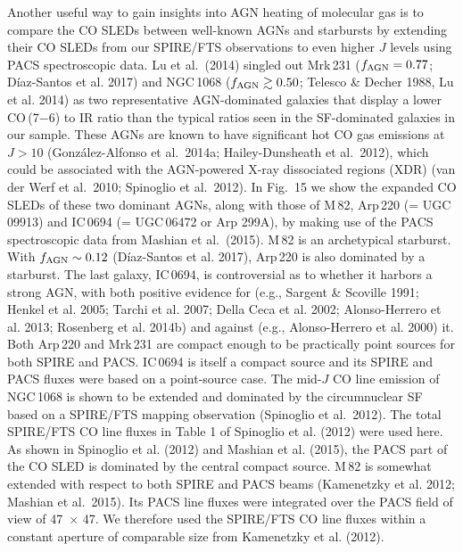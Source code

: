 \documentclass[preprint]{aastex}
\begin{document}
Another useful way to gain insights into AGN heating of molecular gas is to 
compare the CO SLEDs between well-known AGNs and starbursts by extending 
their CO SLEDs from our SPIRE/FTS observations to even higher $J$ levels 
using PACS spectroscopic data.  Lu et al.~(2014) singled out Mrk\,231
($f_{\rm AGN} = 0.77$; D\'iaz-Santos et al. 2017) and NGC\,1068 
($f_{\rm AGN} \gtrsim 0.50$; Telesco \& Decher 1988, Lu et al. 2014)
as two representative AGN-dominated galaxies that display a lower CO\,(7$-$6)
to IR ratio than the typical ratios seen in the SF-dominated galaxies in our sample. 
These AGNs are known to have significant hot CO gas emissions at $J > 10$ 
(Gonz\'alez-Alfonso et al.~2014a; Hailey-Dunsheath et al.~2012), which could
be associated with the AGN-powered X-ray dissociated regions (XDR) 
(van der Werf et al.~2010;  Spinoglio et al.~2012).   In Fig.~15 we show 
the expanded CO SLEDs of these two dominant AGNs, along with those of 
M\,82, Arp\,220 (= UGC 09913) and IC\,0694 (= UGC\,06472 or Arp 299A),
by making use of the PACS spectroscopic data from Mashian et al.~(2015).  
M\,82 is an archetypical starburst.  With $f_{\rm AGN} \sim 0.12$ (D\'iaz-Santos 
et al. 2017),  Arp\,220 is also dominated by a starburst.  The last galaxy, 
IC\,0694, is controversial as to 
whether it harbors a strong AGN, with both positive evidence for (e.g., 
Sargent \& Scoville 1991; Henkel et al. 2005; Tarchi et al. 2007;  
Della Ceca et al. 2002; Alonso-Herrero et al. 2013; Rosenberg et al. 2014b)
and against (e.g., Alonso-Herrero et al. 2000) it. 
Both Arp\,220 and Mrk\,231 are compact enough to be practically point 
sources for both SPIRE and PACS.  IC\,0694 is itself a compact source 
and its SPIRE and PACS fluxes were based on a point-source case.  
The mid-$J$ CO line emission of NGC\,1068 is shown to be extended and 
dominated by the circumnuclear SF based on a SPIRE/FTS mapping observation
(Spinoglio et al.~2012).   The total SPIRE/FTS CO line fluxes in Table 1 of Spinoglio 
et al. (2012) were used here.   As shown in Spinoglio et al. (2012) and 
Mashian et al. (2015), the PACS part of the CO SLED is dominated by 
the central compact source.   M\,82 is somewhat extended with respect to 
both SPIRE and PACS beams (Kamenetzky et al. 2012; Mashian et al.~2015). 
Its PACS line fluxes were integrated over the PACS field of view of 
47\arcsec\ $\times$ 47\arcsec.  We therefore used the SPIRE/FTS CO line fluxes 
within a constant aperture of comparable size from Kamenetzky et al. (2012). 
\end{document}
